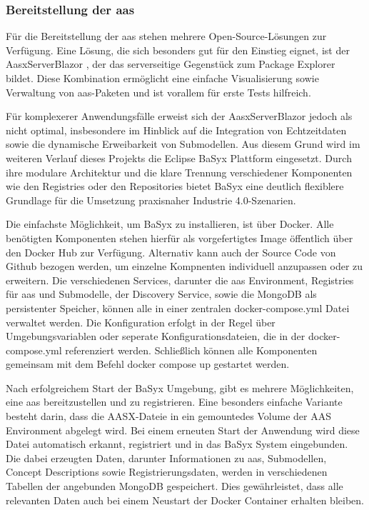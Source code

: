 \newpage
\subsubsection{Bereitstellung der \acs{aas}}
\label{sec:bereitstellungAAS}
Für die Bereitstellung der \acs{aas} stehen mehrere Open-Source-Lösungen zur Verfügung. 
Eine Lösung, die sich besonders gut für den Einstieg eignet, ist der AasxServerBlazor \cite{AASXServer}, der das serverseitige Gegenstück zum Package Explorer bildet. 
Diese Kombination ermöglicht eine einfache Visualisierung sowie Verwaltung von \acs{aas}-Paketen und ist vorallem für erste Tests hilfreich.

Für komplexerer Anwendungsfälle erweist sich der AasxServerBlazor jedoch als nicht optimal, insbesondere im Hinblick auf die Integration von Echtzeitdaten sowie die dynamische Erweibarkeit von Submodellen.
Aus diesem Grund wird im weiteren Verlauf dieses Projekts die Eclipse BaSyx Plattform eingesetzt.
Durch ihre modulare Architektur und die klare Trennung verschiedener Komponenten wie den Registries oder den Repositories bietet BaSyx eine deutlich flexiblere Grundlage für die Umsetzung praxisnaher Industrie 4.0-Szenarien.

Die einfachste Möglichkeit, um BaSyx zu installieren, ist über Docker.
Alle benötigten Komponenten stehen hierfür als vorgefertigtes Image öffentlich über den Docker Hub zur Verfügung.
Alternativ kann auch der Source Code von Github bezogen werden, um einzelne Kompnenten individuell anzupassen oder zu erweitern.
Die verschiedenen Services, darunter die \acs{aas} Environment, Registries für \acs{aas} und Submodelle, der Discovery Service, sowie die MongoDB als persistenter Speicher, können alle in einer zentralen docker-compose.yml Datei verwaltet werden.
Die Konfiguration erfolgt in der Regel über Umgebungsvariablen oder seperate Konfigurationsdateien, die in der docker-compose.yml referenziert werden.
Schließlich können alle Komponenten gemeinsam mit dem Befehl docker compose up gestartet werden.

Nach erfolgreichem Start der BaSyx Umgebung, gibt es mehrere Möglichkeiten, eine \acs{aas} bereitzustellen und zu registrieren.
Eine besonders einfache Variante besteht darin, dass die AASX-Dateie in ein gemountedes Volume der AAS Environment abgelegt wird.
Bei einem erneuten Start der Anwendung wird diese Datei automatisch erkannt, registriert und in das BaSyx System eingebunden.
Die dabei erzeugten Daten, darunter Informationen zu \acs{aas}, Submodellen, Concept Descriptions sowie Registrierungsdaten, werden in verschiedenen Tabellen der angebunden MongoDB gespeichert.
Dies gewährleistet, dass alle relevanten Daten auch bei einem Neustart der Docker Container erhalten bleiben.

